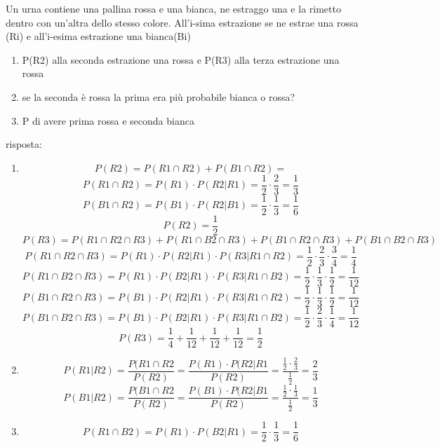 \documentclass[a4paper,12pt, oneside]{book}
\begin{document}
\begin{esercizio}
Un urna contiene una pallina rossa e una bianca, ne estraggo una e la rimetto dentro con un'altra dello stesso colore. All'i-sima estrazione se ne estrae una rossa (Ri) e all'i-esima estrazione una bianca(Bi)
\begin{enumerate}
\item P(R2) alla seconda estrazione una rossa e P(R3) alla terza estrazione una rossa
\item se la seconda è rossa la prima era più probabile bianca o rossa?
\item P di avere prima rossa e seconda bianca
\end{enumerate}
risposta:
\begin{enumerate}
\item \[P(R2)=P(R1\cap R2)+P(B1\cap R2)=\]
\[P(R1\cap R2)=P(R1)\cdot P(R2|R1)= \frac{1}{2}\cdot \frac{2}{3}=\frac{1}{3}\]
\[P(B1\cap R2)=P(B1)\cdot P(R2|B1)=\frac{1}{2}\cdot \frac{1}{3}=\frac{1}{6}\]
\[P(R2)=\frac{1}{2}\]
\[P(R3)=P(R1\cap R2\cap R3)+P(R1\cap B2\cap R3)+P(B1\cap R2\cap R3)+P(B1\cap B2\cap R3)\]
\[P(R1\cap R2\cap R3)=P(R1)\cdot P(R2|R1)\cdot P(R3|R1\cap R2)=\frac{1}{2}\cdot \frac{2}{3}\cdot \frac{3}{4}=\frac{1}{4}\]
\[P(R1\cap B2\cap R3)=P(R1)\cdot P(B2|R1)\cdot P(R3|R1\cap B2)=\frac{1}{2}\cdot \frac{1}{3}\cdot \frac{1}{2}=\frac{1}{12}\]
\[P(B1\cap R2\cap R3)=P(B1)\cdot P(R2|R1)\cdot P(R3|R1\cap R2)=\frac{1}{2}\cdot \frac{1}{3}\cdot \frac{1}{2}=\frac{1}{12}\]
\[P(B1\cap B2\cap R3)=P(B1)\cdot P(B2|R1)\cdot P(R3|R1\cap B2)=\frac{1}{2}\cdot \frac{2}{3}\cdot \frac{1}{4}=\frac{1}{12}\]
\[P(R3)=\frac{1}{4}+\frac{1}{12}+\frac{1}{12}+\frac{1}{12}=\frac{1}{2}\]
\item \[P(R1|R2)=\frac{P(R1\cap R2}{P(R2)}=\frac{P(R1)\cdot P(R2|R1}{P(R2)}=\frac{\frac{1}{2}\cdot \frac{2}{3}}{\frac{1}{2}}=\frac{2}{3}\]
\[P(B1|R2)=\frac{P(B1\cap R2}{P(R2)}=\frac{P(B1)\cdot P(R2|B1}{P(R2)}=\frac{\frac{1}{2}\cdot \frac{1}{3}}{\frac{1}{2}}=\frac{1}{3}\]
\item \[P(R1\cap B2)=P(R1)\cdot P(B2|R1)=\frac{1}{2}\cdot \frac{1}{3}=\frac{1}{6}\]
\end{enumerate}
\end{esercizio}
\end{document}
